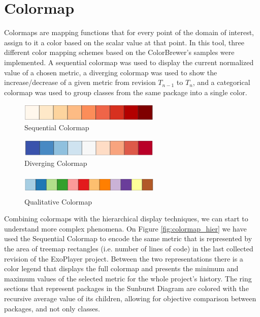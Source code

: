 \section{Colormap} \label{sec:colormap}
Colormaps are mapping functions that for every point of the domain of interest, assign to it a color based on the scalar value at that point. In this tool, three different color mapping schemes based on the ColorBrewer's \cite{ref:colorbrewer} samples were implemented. A sequential colormap was used to display the current normalized value of a chosen metric, a diverging colormap was used to show the increase/decrease of a given metric from revision $T_{n-1}$ to $T_{n}$, and a categorical colormap was used to group classes from the same package into a single color.

\begin{figure}[H]
	\centering
	\includegraphics[width=0.6\textwidth]{figures/seq.png}
	\caption{Sequential Colormap}
	\label{fig:seq}
\end{figure}

\begin{figure}[H]
	\centering
	\includegraphics[width=0.6\textwidth]{figures/div.png}
	\caption{Diverging Colormap}
	\label{fig:div}
\end{figure}

\begin{figure}[H]
	\centering
	\includegraphics[width=0.6\textwidth,height=1.0cm]{figures/quali.png}
	\caption{Qualitative Colormap}
	\label{fig:quali}
\end{figure}

Combining colormaps with the hierarchical display techniques, we can start to understand more complex phenomena. On Figure \ref{fig:colormap_hier} we have used the Sequential Colormap to encode the same metric that is represented by the area of treemap rectangles (i.e. number of lines of code) in the last collected revision of the ExoPlayer project. Between the two representations there is a color legend that displays the full colormap and presents the minimum and maximum values of the selected metric for the whole project's history. The ring sections that represent packages in the Sunburst Diagram are colored with the recursive average value of its children, allowing for objective comparison between packages, and not only classes.


